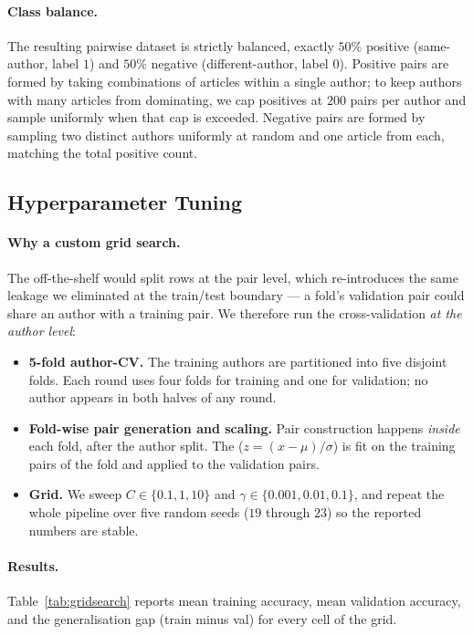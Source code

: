 \documentclass[11pt]{article}
\newcommand{\code}[1]{%
  \tcbox[on line, colback=codebg, colframe=codebg,
         boxrule=0pt, arc=2pt, left=2pt, right=2pt, top=0pt, bottom=0pt]
        {\ttfamily\small #1}}
\begin{document}
\paragraph{Class balance.}
The resulting pairwise dataset is strictly balanced, exactly $50\%$ positive
(same-author, label $1$) and $50\%$ negative (different-author, label $0$).
Positive pairs are formed by taking combinations of articles within a single
author; to keep authors with many articles from dominating, we cap positives
at $200$ pairs per author and sample uniformly when that cap is exceeded.
Negative pairs are formed by sampling two distinct authors uniformly at
random and one article from each, matching the total positive count.

\subsection{Hyperparameter Tuning}

\paragraph{Why a custom grid search.}
The off-the-shelf \code{GridSearchCV} would split rows at the pair level, which
re-introduces the same leakage we eliminated at the train/test boundary --- a
fold's validation pair could share an author with a training pair. We
therefore run the cross-validation \emph{at the author level}:

\begin{itemize}\setlength\itemsep{2pt}
  \item \textbf{5-fold author-CV.} The training authors are partitioned into
        five disjoint folds. Each round uses four folds for training and one
        for validation; no author appears in both halves of any round.
  \item \textbf{Fold-wise pair generation and scaling.} Pair construction
        happens \emph{inside} each fold, after the author split. The
        \code{StandardScaler} ($z = (x-\mu)/\sigma$) is fit on the training
        pairs of the fold and applied to the validation pairs.
  \item \textbf{Grid.} We sweep $C \in \{0.1, 1, 10\}$ and
        $\gamma \in \{0.001, 0.01, 0.1\}$, and repeat the whole pipeline over
        five random seeds ($19$ through $23$) so the reported numbers are
        stable.
\end{itemize}

\paragraph{Results.}
Table~\ref{tab:gridsearch} reports mean training accuracy, mean validation
accuracy, and the generalisation gap (train minus val) for every cell of the
grid.
\end{document}
